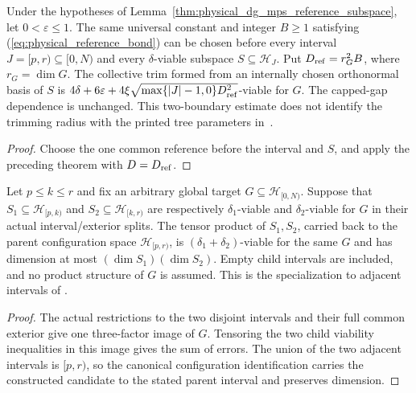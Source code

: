 \begin{lemma}
    \label{thm:physical_dg_interval_trimming}
    \leanok
    Under the hypotheses of Lemma~\ref{thm:physical_dg_mps_reference_subspace},
    let $0<\varepsilon\le1$. The same universal constant and integer
    $B\ge1$ satisfying (\ref{eq:physical_reference_bond}) can be chosen
    before every interval $J=[p,r)\subseteq[0,N)$ and every
    $\delta$-viable subspace $S\subseteq\mathcal H_J$.
    Put $D_{\rm ref}=r_G^2B$, where $r_G=\dim G$.
    The collective trim formed from an internally chosen orthonormal
    basis of $S$ is
    $4\delta+6\varepsilon+4\xi\sqrt{\max\{|J|-1,0\}D_{\rm ref}^2}$-viable
    for $G$.
    The capped-gap dependence is unchanged. This two-boundary estimate
    does not identify the trimming radius with the printed tree parameters
    in~\cite[lines 1801--1805]{Arad2016RigorousRG}.
\end{lemma}
\begin{proof}\leanok
    Choose the one common reference before the interval and $S$, and
    apply the preceding theorem with $D=D_{\rm ref}$.
\end{proof}

\begin{lemma}
    \label{thm:actual_adjacent_interval_merge}
    \leanok
    Let $p\le k\le r$ and fix an arbitrary global target
    $G\subseteq\mathcal H_{[0,N)}$. Suppose that
    $S_1\subseteq\mathcal H_{[p,k)}$ and
    $S_2\subseteq\mathcal H_{[k,r)}$ are respectively
    $\delta_1$-viable and $\delta_2$-viable for $G$ in their actual
    interval/exterior splits. The tensor product of $S_1,S_2$, carried
    back to the parent configuration space $\mathcal H_{[p,r)}$, is
    $(\delta_1+\delta_2)$-viable for the same $G$ and has dimension at
    most $(\dim S_1)(\dim S_2)$.
    Empty child intervals are included, and no product structure of $G$
    is assumed. This is the specialization to adjacent intervals of
    \cite[Lemma on tensoring, lines 500--523]{Arad2016RigorousRG}.
\end{lemma}
\begin{proof}\leanok
    The actual restrictions to the two disjoint intervals and their full
    common exterior give one three-factor image of $G$. Tensoring the
    two child viability inequalities in this image gives the sum of
    errors. The union of the two adjacent intervals is $[p,r)$, so the
    canonical configuration identification carries the constructed
    candidate to the stated parent interval and preserves dimension.
\end{proof}


